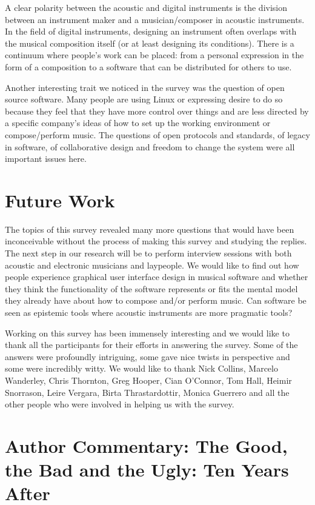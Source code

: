 A clear polarity between the acoustic and digital instruments is the division
between an instrument maker and a musician/composer in acoustic instruments. In
the field of digital instruments, designing an instrument often overlaps with the
musical composition itself (or at least designing its conditions). There is a
continuum where people's work can be placed: from a personal expression in the
form of a composition to a software that can be distributed for others to use.

Another interesting trait we noticed in the survey was the question of open
source software. Many people are using Linux or expressing desire to do so
because they feel that they have more control over things and are less directed
by a specific company's ideas of how to set up the working environment or
compose/perform music. The questions of open protocols and standards, of legacy
in software, of collaborative design and freedom to change the system were all
important issues here.

\section{Future Work}
The topics of this survey revealed many more questions that would have been
inconceivable without the process of making this survey and studying the replies.
The next step in our research will be to perform interview sessions with both
acoustic and electronic musicians and laypeople. We would like to find out how
people experience graphical user interface design in musical software and whether
they think the functionality of the software represents or fits the mental model
they already have about how to compose and/or perform music. Can software be seen
as epistemic tools where acoustic instruments are more pragmatic tools?

\begin{acknowledgement}
Working on this survey has been immensely interesting and we would like to thank
all the participants for their efforts in answering the survey. Some of the
answers were profoundly intriguing, some gave nice twists in perspective and some
were incredibly witty. We would like to thank Nick Collins, Marcelo Wanderley,
Chris Thornton, Greg Hooper, Cian O'Connor, Tom Hall, Heimir Snorrason, Leire
Vergara, Birta Thrastardottir, Monica Guerrero and all the other people who were
involved in helping us with the survey.
\end{acknowledgement}

\section*{Author Commentary: The Good, the Bad and the Ugly: Ten Years After}
